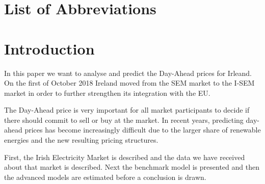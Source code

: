 \documentclass[12pt,a4paper]{article}
\begin{document}
\newpage
\listoffigures
{}

\listoftables
{}

\section*{List of Abbreviations}

\begin{adjustwidth}{1.5em}{0pt}

\begin{acronym}[dummyyyy]


\end{acronym}

\end{adjustwidth}

\restoregeometry

\newpage
{}
\hypertarget{introduction}{%
\section{Introduction}\label{introduction}}

In this paper we want to analyse and predict the Day-Ahead prices for
Irleand. On the first of October 2018 Ireland moved from the \ac{SEM}
market to the \ac{I-SEM} market in order to further strengthen its
integration with the \ac{EU}. \autocite{eridgrid_i-sem_2020}

The Day-Ahead price is very important for all market participants to
decide if there should commit to sell or buy at the market. In recent
years, predicting day-ahead prices has become increasingly difficult due
to the larger share of renewable energies and the new resulting pricing
structures. \autocite{ziel_efficient_2015}

First, the Irish Electricity Market is described and the data we have
received about that market is described. Next the benchmark model is
presented and then the advanced models are estimated before a conclusion
is drawn.
\end{document}
